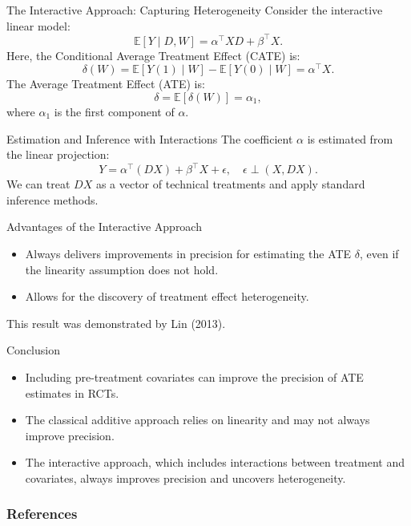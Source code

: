 \documentclass[xcolor=svgnames,t]{beamer}
\begin{document}
    \begin{frame}{The Interactive Approach: Capturing Heterogeneity}
    Consider the interactive linear model:
    \[
    \mathbb{E}[Y \mid D, W] = \alpha^\top X D + \beta^\top X.
    \]
    Here, the Conditional Average Treatment Effect (CATE) is:
    \[
    \delta(W) = \mathbb{E}[Y(1) \mid W] - \mathbb{E}[Y(0) \mid W] = \alpha^\top X.
    \]
    The Average Treatment Effect (ATE) is:
    \[
    \delta = \mathbb{E}[\delta(W)] = \alpha_1,
    \]
    where $\alpha_1$ is the first component of $\alpha$.
    
    \vspace{0.5cm} %
    
    \end{frame}
    
    \begin{frame}{Estimation and Inference with Interactions}
    The coefficient $\alpha$ is estimated from the linear projection:
    \[
    Y = \alpha^\top (D X) + \beta^\top X + \epsilon, \quad \epsilon \perp (X, D X).
    \]
    We can treat $D X$ as a vector of technical treatments and apply standard inference methods.
    
    \vspace{1cm} %
    
    \end{frame}
    
    \begin{frame}{Advantages of the Interactive Approach}
    \begin{itemize}
        \item Always delivers improvements in precision for estimating the ATE $\delta$, even if the linearity assumption does not hold.
        \item Allows for the discovery of treatment effect heterogeneity.
    \end{itemize}
    
    This result was demonstrated by Lin (2013).
    
    \vspace{1cm} %
    
    \end{frame}
    
    \begin{frame}{Conclusion}
    \begin{itemize}
        \item Including pre-treatment covariates can improve the precision of ATE estimates in RCTs.
        \item The classical additive approach relies on linearity and may not always improve precision.
        \item The interactive approach, which includes interactions between treatment and covariates, always improves precision and uncovers heterogeneity.
    \end{itemize}
    
    \vspace{1cm} %
    
    \end{frame}

    
\begin{frame} [allowframebreaks]
    \frametitle{References}
    
    
\end{frame}
\end{document}
